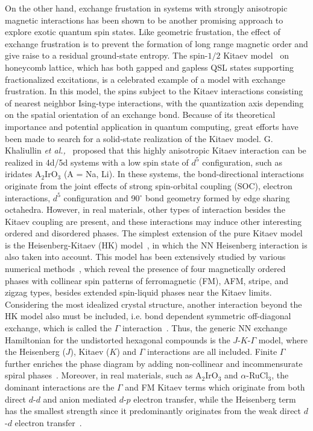 \documentclass[aps,prb,reprint,amsfonts,amsmath,amssymb,showpacs,groupedaddress,superscriptaddress]{revtex4-1}
\begin{document}
On the other hand, exchange frustation in systems with strongly anisotropic magnetic interactions has been shown to be another promising approach to explore exotic quantum spin states. Like geometric frustation, the effect of exchange frustration is to prevent the formation of long range magnetic order and give raise to a residual ground-state entropy. The spin-$1/2$ Kitaev model~\cite{Kitaev2006} on honeycomb lattice, which has both gapped and gapless QSL states supporting fractionalized excitations, is a celebrated example of a model with exchange frustration. In this model, the spins subject to the Kitaev interactions consisting of nearest neighbor Ising-type interactions, with the quantization axis depending on the spatial orientation of an exchange bond. Because of its theoretical importance and potential application in quantum computing, great efforts have been made to search for a solid-state realization of the Kitaev model. G. Khaliullin \emph{et al.,}~\cite{Khaliullin2005,PhysRevLett.102.017205} proposed that this highly anisotropic Kitaev interaction can be realized in 4d/5d systems with a low spin state of $d^5$ configuration, such as iridates A$_2$IrO$_3$ (A = Na, Li). In these systems, the bond-directional interactions originate from the joint effects of strong spin-orbital coupling (SOC), electron interactions, $d^5$ configuration and 90$^\circ$ bond geometry formed by edge sharing octahedra. However, in real materials, other types of interaction besides the Kitaev coupling are present, and these interactions may induce other interesting ordered and disordered phases. The simplest extension of the pure Kitaev model is the Heisenberg-Kitaev (HK) model~\cite{PhysRevLett.105.027204,10.1146/annurev-conmatphys-033117-053934}, in which the NN Heisenberg interaction is also taken into account. This model has been extensively studied by various numerical methods~\cite{PhysRevLett.110.097204,PhysRevB.83.245104,PhysRevB.84.100406,PhysRevB.90.195102,PhysRevLett.119.157203}, which reveal the presence of four magnetically ordered phases with collinear spin patterns of ferromagnetic (FM), AFM, stripe, and zigzag types, besides extended spin-liquid phases near the Kitaev limits. Considering the most idealized crystal structure, another interaction beyond the HK model also must be included, i.e. bond dependent symmetric off-diagonal exchange, which is called the $\Gamma$ interaction~\cite{PhysRevLett.112.077204,PhysRevB.93.214431,PhysRevB.96.115103}. Thus, the generic NN exchange Hamiltonian for the undistorted hexagonal compounds is the $J$-$K$-$\Gamma$ model, where the Heisenberg ($J$), Kitaev ($K$) and $\Gamma$ interactions are all included. Finite $\Gamma$ further enriches the phase diagram by adding non-collinear and incommensurate spiral phases~\cite{PhysRevLett.112.077204,Winter_2017,10.1038/s42254-019-0038-2}. Moreover, in real materials, such as A$_2$IrO$_3$ and $\alpha$-RuCl$_{3}$, the dominant interactions are the $\Gamma$ and FM Kitaev terms which originate from both direct $d$-$d$ and anion mediated $d$-$p$ electron transfer, while the Heisenberg term has the smallest strength since it predominantly originates from the weak direct $d$-$d$ electron transfer~\cite{PhysRevLett.112.077204,PhysRevB.93.214431,PhysRevB.96.115103}.
\end{document}

